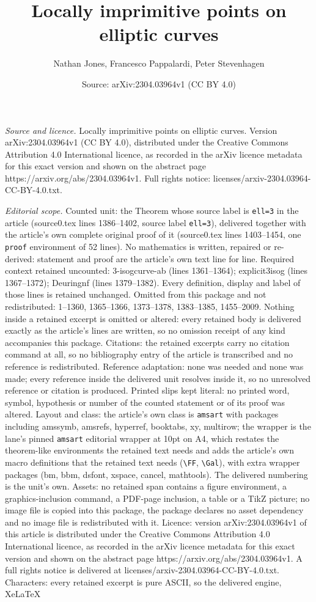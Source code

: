 \documentclass[10pt,a4paper]{amsart}
\title[Locally imprimitive points on elliptic curves]{Locally imprimitive points on elliptic curves}
\author{Nathan Jones, Francesco Pappalardi, Peter Stevenhagen}
\date{Source: arXiv:2304.03964v1 (CC BY 4.0)}
\begin{document}
\maketitle

\noindent\emph{Source and licence.} Locally imprimitive points on elliptic curves. Version arXiv:2304.03964v1 (CC BY 4.0), distributed under the Creative Commons Attribution 4.0 International licence, as recorded in the arXiv licence metadata for this exact version and shown on the abstract page https://arxiv.org/abs/2304.03964v1. Full rights notice: licenses/arxiv-2304.03964-CC-BY-4.0.txt.\par\smallskip

\noindent\textit{Editorial scope.} Counted unit: the Theorem whose source label is \texttt{ell=3} in the article (source0.tex lines 1386--1402, source label \texttt{ell=3}), delivered together with the article's own complete original proof of it (source0.tex lines 1403--1454, one \texttt{proof} environment of 52 lines). No mathematics is written, repaired or re-derived: statement and proof are the article's own text line for line. Required context retained uncounted: 3-isogcurve-ab (lines 1361--1364); explicit3isog (lines 1367--1372); Deuringnf (lines 1379--1382). Every definition, display and label of those lines is retained unchanged. Omitted from this package and not redistributed: 1--1360, 1365--1366, 1373--1378, 1383--1385, 1455--2009. Nothing inside a retained excerpt is omitted or altered: every retained body is delivered exactly as the article's lines are written, so no omission receipt of any kind accompanies this package. Citations: the retained excerpts carry no citation command at all, so no bibliography entry of the article is transcribed and no reference is redistributed. Reference adaptation: none was needed and none was made; every reference inside the delivered unit resolves inside it, so no unresolved reference or citation is produced. Printed slips kept literal: no printed word, symbol, hypothesis or number of the counted statement or of its proof was altered. Layout and class: the article's own class is \texttt{amsart} with packages including amssymb, amsrefs, hyperref, booktabs, xy, multirow; the wrapper is the lane's pinned \texttt{amsart} editorial wrapper at 10pt on A4, which restates the theorem-like environments the retained text needs and adds the article's own macro definitions that the retained text needs (\texttt{\textbackslash FF}, \texttt{\textbackslash Gal}), with extra wrapper packages (bm, bbm, dsfont, xspace, cancel, mathtools). The delivered numbering is the unit's own. Assets: no retained span contains a figure environment, a graphics-inclusion command, a PDF-page inclusion, a table or a TikZ picture; no image file is copied into this package, the package declares no asset dependency and no image file is redistributed with it. Licence: version arXiv:2304.03964v1 of this article is distributed under the Creative Commons Attribution 4.0 International licence, as recorded in the arXiv licence metadata for this exact version and shown on the abstract page https://arxiv.org/abs/2304.03964v1. A full rights notice is delivered at licenses/arxiv-2304.03964-CC-BY-4.0.txt. Characters: every retained excerpt is pure ASCII, so the delivered engine, XeLaTeX 
\end{document}
